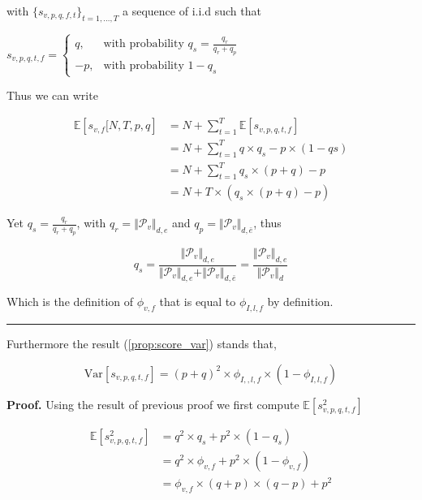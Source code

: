 \documentclass[a4paper, 11pt]{article}
\newcommand{\Var}{\mathrm{Var}}
\begin{document}
with $\lbrace s_{v, p, q, f, t} \rbrace_{t=1, \ldots, T}$ a sequence of i.i.d such that

\begin{center}
$s_{v, p, q, t, f} = \begin{cases} q, & \text{with probability } q_s = \frac{q_r}{q_r + q_p}  \\ -p, & \text{with probability } 1 - q_s \end{cases}$
\end{center}

Thus we can write

\begin{align*}
\mathbb{E}\left[ s_{v, f}[N, T, p, q \right] &= N + \sum_{t=1}^{T} \mathbb{E} \left[ s_{v, p, q, t, f}\right]\\
&= N + \sum_{t=1}^{T} q \times q_s - p \times (1 - qs)\\
&= N + \sum_{t=1}^{T} q_s \times (p + q) - p \\
&= N + T \times \left(q_s \times (p + q) - p \right) 
\end{align*}

Yet $q_s = \frac{q_r}{q_r + q_p}$, with $q_r = \Vert \mathcal{P}_v \Vert_{d, e}$ and $q_p = \Vert \mathcal{P}_v \Vert_{d,\bar{e}}$, thus

\begin{equation*}
q_s = \frac{\Vert \mathcal{P}_v \Vert_{d, e}}{\Vert \mathcal{P}_v \Vert_{d, e} + \Vert \mathcal{P}_v \Vert_{d,\bar{e}}} = \frac{\Vert \mathcal{P}_v \Vert_{d, e}}{\Vert \mathcal{P}_v \Vert_{d}}
\end{equation*}

Which is the definition of $\phi_{v, f}$ that is equal to $\phi_{I,l, f}$ by definition.

\begin{center}
\rule[0pt]{100pt}{1pt} 
\end{center}

Furthermore the result (\ref{prop:score_var}) stands that,

\begin{equation*}
\Var \left[ s_{v, p, q, t, f}  \right] = (p + q)^{2} \times \phi_{I,, l, f} \times (1 - \phi_{I, l, f})
\end{equation*}

\textbf{Proof.} Using the result of previous proof we first compute $\mathbb{E}\left[  s_{v, p, q, t, f}^{2}\right]$

\begin{align*}
\mathbb{E}\left[  s_{v, p, q, t, f}^{2}\right] &= q^{2} \times q_s + p^{2} \times (1 - q_s)\\
&=  q^{2} \times \phi_{v, f} + p^{2} \times (1 - \phi_{v, f})\\
&= \phi_{v, f}\times (q + p)\times (q - p) + p^{2}
\end{align*}
\end{document}
